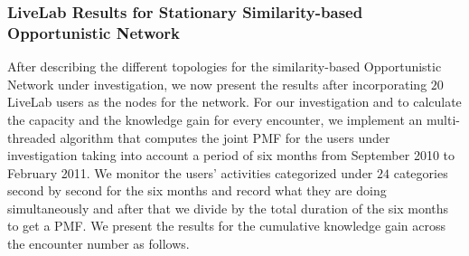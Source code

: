 \documentclass[11pt]{article}
\begin{document}

\subsubsection{LiveLab Results for Stationary Similarity-based Opportunistic Network }
After describing the different topologies for the similarity-based Opportunistic Network under investigation, we now present the results after incorporating $20$ LiveLab users as the nodes for the network. For our investigation and to calculate the capacity and the knowledge gain for every encounter, we implement an multi-threaded algorithm that computes the joint PMF for the users under investigation taking into account a period of six months from September 2010 to February 2011. We monitor the users' activities categorized under $24$ categories second by second for the six months and record what they are doing simultaneously and after that we divide by the total duration of the six months to get a PMF. We present the results for the cumulative knowledge gain across the encounter number as follows.
\end{document}
